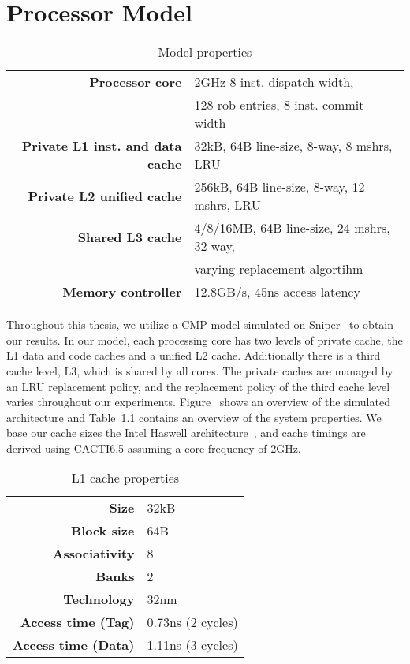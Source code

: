 
\chapter{Processor Model}
\label{cpt:processor_model}

\begin{table}[ht]
\centering
\begin{tabular}{rl}
\toprule
\bf{Processor core}                 & 2GHz 8 inst. dispatch width,          \\
				    & 128 rob entries, 8 inst. commit width \\
\bf{Private L1 inst. and data cache}& 32kB, 64B line-size, 8-way, 8 mshrs, LRU \\
\bf{Private L2 unified cache}       & 256kB, 64B line-size, 8-way, 12 mshrs, LRU      \\
\bf{Shared L3 cache}                & 4/8/16MB, 64B line-size, 24 mshrs, 32-way,      \\
				    & varying replacement algortihm         \\
\bf{Memory controller}              & 12.8GB/s, 45ns access latency         \\
\bottomrule                             
\end{tabular}
\caption{Model properties}
\label{tbl:processor_model:properties}
\end{table}

Throughout this thesis, we utilize a CMP model simulated on Sniper~\cite{Carlson2011a} to obtain our results. 
In our model, each processing core has two levels of private cache, the L1 data and code caches and a unified L2 cache.
Additionally there is a third cache level, L3, which is shared by all cores. 
The private caches are managed by an LRU replacement policy, and the replacement policy of the third cache level varies throughout our experiments.
Figure~ shows an overview of the simulated architecture and Table~\ref{tbl:processor_model:properties} contains an overview of the system properties.
We base our cache sizes the Intel Haswell architecture~\cite{Jain2013}, and cache timings are derived using CACTI6.5 assuming a core frequency of 2GHz.

\begin{table}[ht]
\centering
\begin{tabular}{rl}
\toprule
\bf{Size}               & 32kB              \\
\bf{Block size}         & 64B               \\
\bf{Associativity}      & 8                 \\
\bf{Banks}              & 2                 \\
\bf{Technology}         & 32nm              \\
\bf{Access time (Tag)}  & 0.73ns (2 cycles) \\
\bf{Access time (Data)} & 1.11ns (3 cycles) \\
\bottomrule
\end{tabular}
\caption{L1 cache properties}
\label{tbl:processor_model:l1}
\end{table}


